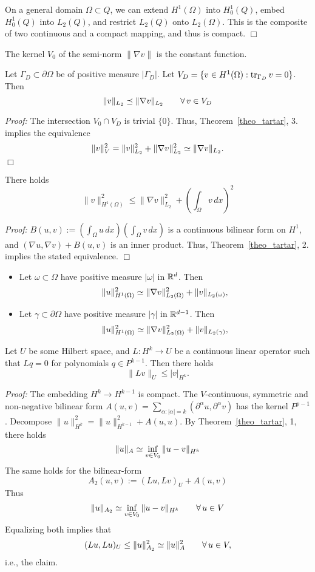 On a general domain $\Omega \subset Q$, we can extend $H^1(\Omega)$ 
into $H_0^1(Q)$, embed $H_0^1(Q)$ into $L_2(Q)$, and restrict $L_2(Q)$
onto $L_2(\Omega)$. This is the composite of two continuous and a compact
mapping, and thus is compact.
\hfill $\Box$

\bigskip
\noindent

The kernel $V_0$ of the semi-norm $\| \nabla v \|$ is the constant function.

\begin{theorem} 
Let $\Gamma_D \subset \partial \Omega$ be of positive measure $|\Gamma_D|$.
Let $V_D = \{ v \in H^1(\Omega) : \operatorname{tr}_{\Gamma_D} v = 0 \}$. Then
$$
\| v \|_{L_2} \preceq \| \nabla v \|_{L_2} \qquad \forall \, v \in V_D
$$
\end{theorem}
{\em Proof:} The intersection $V_0 \cap V_D$ is trivial $\{ 0 \}$. 
Thus, Theorem~\ref{theo_tartar}, 3. implies the equivalence  
$$
\| v \|_V^2 = \| v \|_{L_2}^2 + \| \nabla v \|_{L_2}^2 \simeq
\| \nabla v \|_{L_2}.
$$
\hfill $\Box$


\begin{theorem} 
There holds
$$
\| v \|_{H^1(\Omega)}^2 \leq \| \nabla v \|_{L_2}^2 + (\int_\Omega v \, dx)^2
$$
\end{theorem}
{\em Proof:} $B(u,v) := (\int_\Omega u \, dx) (\int_\Omega v \, dx)$ is
a continuous bilinear form on $H^1$, and $(\nabla u, \nabla v) + B(u,v)$ is
an inner product. Thus, Theorem~\ref{theo_tartar}, 2. implies the 
stated equivalence.
\hfill $\Box$

\begin{itemize}
\item
Let $\omega \subset \Omega$ have positive measure $| \omega|$ in ${\mathbb R}^d$.
Then
$$
\| u \|_{H^1(\Omega)}^2 \simeq
 \| \nabla v \|_{L_2(\Omega)}^2 + \| v \|_{L_2(\omega)},
$$
\item
Let $\gamma \subset \partial \Omega$ have positive measure $| \gamma|$ in ${\mathbb R}^{d-1}$. Then
$$
\| u \|_{H^1(\Omega)}^2 \simeq
\| \nabla v \|_{L_2(\Omega)}^2 + \| v \|_{L_2(\gamma)},
$$
\end{itemize}


\begin{theorem} \label{lemma_bh} 
Let $U$ be some Hilbert space, and
$L : H^k \rightarrow U$ be a continuous linear operator such that 
$L q = 0$ for polynomials $q \in P^{k-1}$. Then there holds
$$
\| L v \|_U \leq | v |_{H^k}.
$$
\end{theorem}
{\em Proof:} The embedding $H^k \rightarrow H^{k-1}$ is compact. 
The $V$-continuous, symmetric and non-negative bilinear form
$A(u,v) = \sum_{\alpha : | \alpha | = k} (\partial^\alpha u, \partial^\alpha v)$ has the kernel $P^{p-1}$. Decompose $\| u \|_{H^k}^2 = \| u \|_{H^{k-1}}^2 + A(u,u)$. By Theorem~\ref{theo_tartar}, 1, there holds
$$
\| u \|_A \simeq \inf_{v \in V_0} \| u - v \|_{H^k}
$$
The same holds for the bilinear-form
$$
A_2(u,v) := (L u, Lv)_U + A(u,v)
$$
Thus
$$
\| u \|_{A_2} \simeq  \inf_{v \in V_0} \| u - v \|_{H^k} \qquad \forall \, u \in V
$$
Equalizing both  implies that
$$
(L u, Lu)_U \leq \| u \|_{A_2}^2 \simeq \| u \|_A^2  \qquad \forall \, u \in V,
$$
i.e., the claim.

